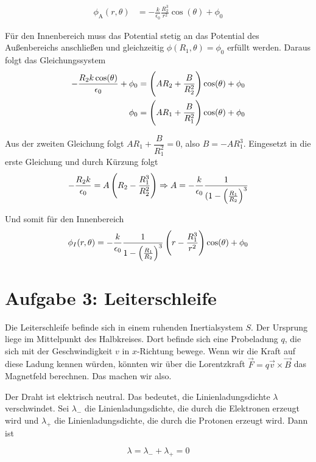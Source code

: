 \documentclass[a4paper,german,12pt,smallheadings]{scrartcl}
\begin{document}
\begin{align*}
  \phi_\text{A}(r,\theta) &= -\frac{k}{\epsilon_0} \frac{R_2^3}{r^2} \cos(\theta) + \phi_0
\end{align*}

Für den Innenbereich muss das Potential stetig an das Potential des
Außenbereichs anschließen und gleichzeitig $\phi(R_1,\theta) = \phi_0$ erfüllt
werden. Daraus folgt das Gleichungssystem
\begin{align*}
  -\frac{R_2 k \cos(\theta)}{\epsilon_0} + \phi_0 &= \del{AR_2 + \frac{B}{R_2^2}} \cos(\theta) + \phi_0 \\
                                           \phi_0 &= \del{AR_1 + \frac{B}{R_1^2}} \cos(\theta) + \phi_0
\end{align*}

Aus der zweiten Gleichung folgt $AR_1 + \dfrac{B}{R_1^2} = 0$, also $B =
-AR_1^3$. Eingesetzt in die erste Gleichung und durch Kürzung folgt
\begin{equation}
  -\frac{R_2 k}{\epsilon_0} = A \del{R_2 - \frac{R_1^3}{R_2^2}} \Rightarrow
  A = -\frac{k}{\epsilon_0} \frac{1}{(1- \del{\frac{R_1}{R_2}}^3}
\end{equation}

Und somit für den Innenbereich
\begin{equation}
  \phi_I(r, \theta) = -\frac{k}{\epsilon_0} \frac{1}{1-\del{\frac{R_1}{R_2}}^3} \del{r - \frac{R_1^3}{r^2}} \cos(\theta) + \phi_0
\end{equation}

\section*{Aufgabe 3: Leiterschleife}

Die Leiterschleife befinde sich in einem ruhenden Inertialsystem $S$. Der
Ursprung liege im Mittelpunkt des Halbkreises. Dort befinde sich eine
Probeladung $q$, die sich mit der Geschwindigkeit $v$ in $x$-Richtung bewege.
Wenn wir die Kraft auf diese Ladung kennen würden, könnten wir über die
Lorentzkraft $\vec{F} = q\vec{v} \times \vec{B}$ das Magnetfeld berechnen. Das
machen wir also.

Der Draht ist elektrisch neutral. Das bedeutet, die Linienladungsdichte
$\lambda$ verschwindet. Sei $\lambda_-$ die Linienladungsdichte, die durch die
Elektronen erzeugt wird und $\lambda_+$ die Linienladungsdichte, die durch die
Protonen erzeugt wird. Dann ist

\begin{equation}
  \lambda = \lambda_- + \lambda_+ = 0
\end{equation}
\end{document}
